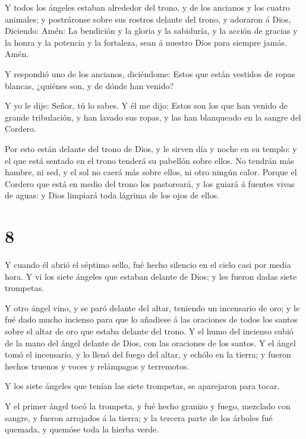 Y todos los ángeles estaban alrededor del trono, y de los
ancianos y los cuatro animales; y postráronse sobre sus rostros delante
del trono, y adoraron á Dios,  Diciendo: Amén: La bendición
y la gloria y la sabiduría, y la acción de gracias y la honra y la
potencia y la fortaleza, sean á nuestro Dios para siempre jamás. Amén.

 Y respondió uno de los ancianos, diciéndome: Estos que
están vestidos de ropas blancas, ¿quiénes son, y de dónde han venido?

 Y yo le dije: Señor, tú lo sabes. Y él me dijo: Estos son
los que han venido de grande tribulación, y han lavado sus ropas, y las
han blanqueado en la sangre del Cordero.

 Por esto están delante del trono de Dios, y le sirven día
y noche en su templo: y el que está sentado en el trono tenderá su
pabellón sobre ellos.  No tendrán más hambre, ni sed, y el
sol no caerá más sobre ellos, ni otro ningún calor.  Porque
el Cordero que está en medio del trono los pastoreará, y los guiará á
fuentes vivas de aguas: y Dios limpiará toda lágrima de los ojos de
ellos.

\hypertarget{section-7}{%
\section{8}\label{section-7}}

 Y cuando él abrió el séptimo sello, fué hecho silencio en
el cielo casi por media hora.  Y vi los siete ángeles que
estaban delante de Dios; y les fueron dadas siete trompetas.

 Y otro ángel vino, y se paró delante del altar, teniendo un
incensario de oro; y le fué dado mucho incienso para que lo añadiese á
las oraciones de todos los santos sobre el altar de oro que estaba
delante del trono.  Y el humo del incienso subió de la mano
del ángel delante de Dios, con las oraciones de los santos. 
Y el ángel tomó el incensario, y lo llenó del fuego del altar, y echólo
en la tierra; y fueron hechos truenos y voces y relámpagos y terremotos.

 Y los siete ángeles que tenían las siete trompetas, se
aparejaron para tocar.

 Y el primer ángel tocó la trompeta, y fué hecho granizo y
fuego, mezclado con sangre, y fueron arrojados á la tierra; y la tercera
parte de los árboles fué quemada, y quemóse toda la hierba verde.

